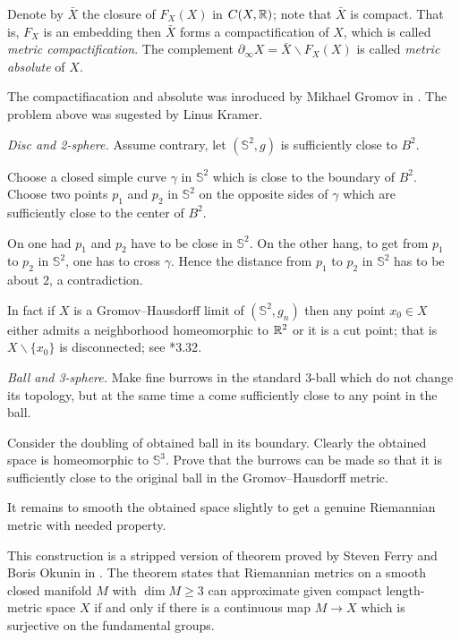 Denote by $\bar X$ 
the closure of $F_X(X)$ in $C(X,\mathbb{R})$;
note that $\bar X$ is compact.
That is, $F_X$ is an embedding 
then $\bar X$ forms a compactification of $X$,
which is called \emph{metric compactification}.
The complement 
$\partial_\infty X=\bar X\backslash F_X(X)$ 
is called \emph{metric absolute} of $X$.

The compactifiacation
and absolute
was inroduced by Mikhael Gromov in \cite{gromov-hyperbolic}.
The problem above was sugested by Linus Kramer.



\textit{Disc and 2-sphere.}
Assume contrary, let $(\mathbb{S}^2,g)$ is sufficiently close to $B^2$.

Choose a closed simple curve $\gamma$ in $\mathbb{S}^2$ which is close to the boundary of $B^2$.
Choose two points $p_1$ and $p_2$ in $\mathbb{S}^2$ 
on the opposite sides of $\gamma$ which are sufficiently close to the center of $B^2$.

On one had $p_1$ and $p_2$ have to be close in $\mathbb{S}^2$.
On the other hang, to get from $p_1$ to $p_2$ in $\mathbb{S}^2$,
one has to cross $\gamma$.
Hence the distance from $p_1$ to $p_2$ in $\mathbb{S}^2$ has to be about $2$,
a contradiction.

In fact if $X$ is a Gromov--Hausdorff limit of $(\mathbb{S}^2,g_n)$
then any point $x_0\in X$ either admits a neighborhood homeomorphic to $\mathbb{R}^2$ or it is a cut point;
that is $X\backslash\{x_0\}$ is disconnected; see \cite{gromov-MetStr}*{3.32}.

\textit{Ball and 3-sphere.}
Make fine burrows in the standard 3-ball which do not change its topology,
but at the same time a come sufficiently close to any point in the ball.

Consider the doubling of obtained ball in its boundary.
Clearly the obtained space is homeomorphic to $\mathbb{S}^3$.
Prove that the burrows can be made 
so that it is sufficiently close to the original ball 
in the Gromov--Hausdorff metric.

It remains to smooth the obtained space slightly 
to get a genuine Riemannian metric with needed property.

This construction is a stripped version of theorem proved by Steven Ferry and Boris Okunin in \cite{ferry-okun}.
The theorem states that Riemannian metrics on a smooth closed manifold $M$ with $\dim M\ge 3$ 
can approximate given compact length-metric space $X$ 
if and only if 
there is a continuous map $M\to X$
which is surjective on the fundamental groups. 

